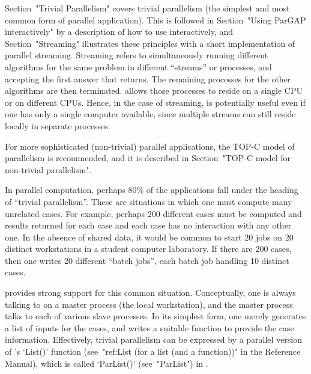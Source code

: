 

Section~"Trivial Parallelism" covers trivial  parallelism  (the  simplest
and most common form  of  parallel  application).  This  is  followed  in
Section~"Using ParGAP interactively" by  a  description  of  how  to  use
{\ParGAP}  interactively,  and  Section~"Streaming"   illustrates   these
principles with a short implementation of parallel  streaming.  Streaming
refers to  simultaneously  running  different  algorithms  for  the  same
problem in different ``streams'' or processes, and  accepting  the  first
answer that returns. The remaining processes for the other algorithms are
then terminated. {\ParGAP} allows those processes to reside on  a  single
CPU or on different CPUs. Hence, in the case of streaming,  {\ParGAP}  is
potentially useful even if one has  only  a  single  computer  available,
since multiple streams can still reside locally in separate processes.

For more sophisticated (non-trivial)  parallel  applications,  the  TOP-C
model  of  parallelism  is  recommended,   and   it   is   described   in
Section~"TOP-C model for non-trivial parallelism".


In parallel computation, perhaps 80\% of the applications fall under  the
heading of ``trivial parallelism''. These are  situations  in  which  one
must compute many unrelated cases. For  example,  perhaps  200  different
cases must be computed and results returned for each case and  each  case
has no interaction with any other one. In the absence of shared data,  it
would be common to start 20 {\GAP} jobs on 20 distinct workstations in  a
student computer laboratory. If there are 200 cases, then one  writes  20
different ``batch jobs'', each batch job handling 10 distinct cases.

{\ParGAP}  provides   strong   support   for   this   common   situation.
Conceptually, one is always talking to {\ParGAP} on a master process (the
local workstation), and the master process talks to each of various slave
processes. In its simplest form, one merely generates a  list  of  inputs
for the cases, and  writes  a  suitable  function  to  provide  the  case
information. Effectively, trivial  parallelism  can  be  expressed  by  a
parallel version of {\GAP}'s `List()'  function  
(see~"ref:List (for a list (and a function))"  in  the Reference  Manual),  
which  is  called  `ParList()'  (see~"ParList")   in
{\ParGAP}.

